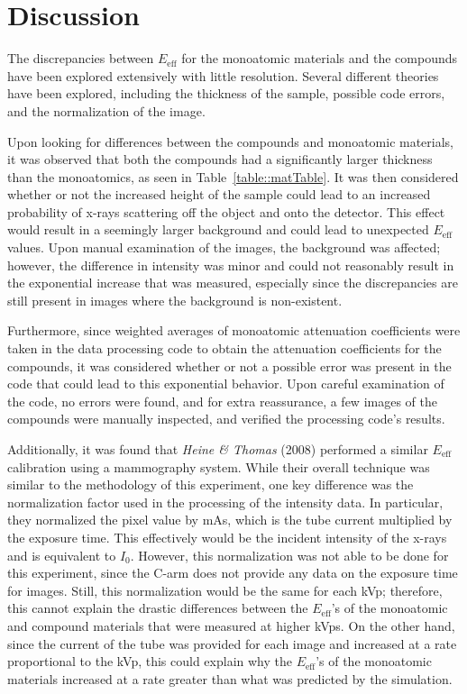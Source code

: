 \section{Discussion}

\par The discrepancies between $E_{\text{eff}}$ for the monoatomic materials and the compounds have been explored extensively with little resolution. Several different theories have been explored, including the thickness of the sample, possible code errors, and the normalization of the image.

\par Upon looking for differences between the compounds and monoatomic materials, it was observed that both the compounds had a significantly larger thickness than the monoatomics, as seen in Table~\ref{table::matTable}. It was then considered whether or not the increased height of the sample could lead to an increased probability of x-rays scattering off the object and onto the detector. This effect would result in a seemingly larger background and could lead to unexpected $E_{\text{eff}}$ values. Upon manual examination of the images, the background was affected; however, the difference in intensity was minor and could not reasonably result in the exponential increase that was measured, especially since the discrepancies are still present in images where the background is non-existent.

\par Furthermore, since weighted averages of monoatomic attenuation coefficients were taken in the data processing code to obtain the attenuation coefficients for the compounds, it was considered whether or not a possible error was present in the code that could lead to this exponential behavior. Upon careful examination of the code, no errors were found, and for extra reassurance, a few images of the compounds were manually inspected, and verified the processing code's results.

\par Additionally, it was found that \textit{Heine \& Thomas} (2008) \cite{Heine} performed a similar $E_{\text{eff}}$ calibration using a mammography system. While their overall technique was similar to the methodology of this experiment, one key difference was the normalization factor used in the processing of the intensity data. In particular, they normalized the pixel value by mAs, which is the tube current multiplied by the exposure time. This effectively would be the incident intensity of the x-rays and is equivalent to $I_0$. However, this normalization was not able to be done for this experiment, since the C-arm does not provide any data on the exposure time for images. Still, this normalization would be the same for each kVp; therefore, this cannot explain the drastic differences between the $E_{\text{eff}}$'s of the monoatomic and compound materials that were measured at higher kVps. On the other hand, since the current of the tube was provided for each image and increased at a rate proportional to the kVp, this could explain why the $E_{\text{eff}}$'s of the monoatomic materials increased at a rate greater than what was predicted by the simulation. 

